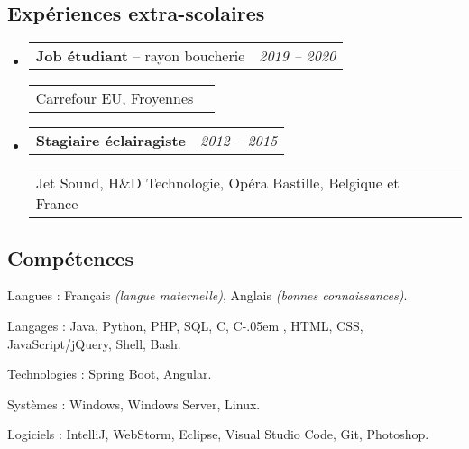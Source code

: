 \documentclass[10pt,a4paper]{article}
\makeatletter
\newcommand{\Csharp}{%
  {\settoheight{\dimen0}{C}C\kern-.05em \resizebox{!}{\dimen0}{\raisebox{\depth}{\#}}}}
\newenvironment{indentsection}[1]
{\begin{list}{}
  {\setlength{\leftmargin}{#1}} \item[]
}
{\end{list}}
\newcommand{\headerrow}[2]
{\begin{tabular*}{\linewidth}{l@{\extracolsep{\fill}}r}
  #1 &
  #2 \\
\end{tabular*}}
\makeatother
\begin{document}
\subsection*{Expériences extra-scolaires}
\begin{itemize}
  \parskip=0.1em

  \item
  \headerrow
    {\textbf{Job étudiant} -- rayon boucherie}
    {\emph{2019 -- 2020}}
  \headerrow
    {{Carrefour EU, Froyennes}}
    {\emph{}}
  \item
  \headerrow
    {\textbf{Stagiaire éclairagiste}}
    {\emph{2012 -- 2015}}
  \headerrow
    {{Jet Sound, H\&D Technologie, Opéra Bastille, Belgique et France}}
    {\emph{}}
\end{itemize}


\vspace{-0.4em}
\subsection*{Compétences}
\begin{indentsection}{\parindent}
\begin{description*}
  \item[Langues :]
  Français \emph{(langue maternelle)}, %
  Anglais \emph{(bonnes connaissances)}.
  \item[Langages :] Java, Python, PHP, SQL, C, \Csharp, HTML,
  CSS,  JavaScript/jQuery, Shell, Bash.
  \item[Technologies :] Spring Boot, Angular.
  \item[Systèmes :] Windows, Windows Server, Linux.
  \item[Logiciels :] IntelliJ, WebStorm, Eclipse, Visual Studio Code, Git,
  Photoshop.
\end{description*}
\end{indentsection}
\end{document}
